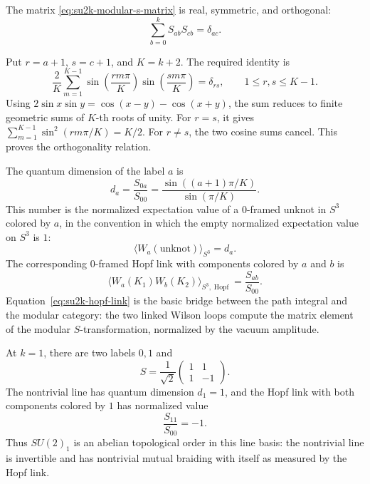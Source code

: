\begin{remark}
\label{rem:su2k-s-matrix-orthogonality}
The matrix \eqref{eq:su2k-modular-s-matrix} is real, symmetric, and
orthogonal:
\[
  \sum_{b=0}^k S_{ab}S_{cb}=\delta_{ac}.
\]

Put \(r=a+1\), \(s=c+1\), and \(K=k+2\).  The required identity is
\[
  \frac{2}{K}\sum_{m=1}^{K-1}
  \sin\!\left(\frac{rm\pi}{K}\right)
  \sin\!\left(\frac{sm\pi}{K}\right)
  =
  \delta_{rs},
  \qquad 1\le r,s\le K-1 .
\]
Using \(2\sin x\sin y=\cos(x-y)-\cos(x+y)\), the sum reduces to finite
geometric sums of \(K\)-th roots of unity.  For \(r=s\), it gives
\(\sum_{m=1}^{K-1}\sin^2(rm\pi/K)=K/2\).  For \(r\ne s\), the two cosine
sums cancel.  This proves the orthogonality relation.
\end{remark}

The quantum dimension of the label \(a\) is
\begin{equation}
  d_a=\frac{S_{0a}}{S_{00}}
  =
  \frac{\sin((a+1)\pi/K)}{\sin(\pi/K)} .
  \label{eq:su2k-quantum-dimension}
\end{equation}
This number is the normalized expectation value of a \(0\)-framed unknot in
\(S^3\) colored by \(a\), in the convention in which the empty normalized
expectation value on \(S^3\) is \(1\):
\begin{equation}
  \langle W_a(\text{unknot})\rangle_{S^3}
  =
  d_a .
  \label{eq:su2k-unknot-quantum-dimension}
\end{equation}
The corresponding \(0\)-framed Hopf link with components colored by \(a\) and
\(b\) is
\begin{equation}
  \langle W_a(K_1)W_b(K_2)\rangle_{S^3,\operatorname{Hopf}}
  =
  \frac{S_{ab}}{S_{00}} .
  \label{eq:su2k-hopf-link}
\end{equation}
Equation~\eqref{eq:su2k-hopf-link} is the basic bridge between the path
integral and the modular category: the two linked Wilson loops compute the
matrix element of the modular \(S\)-transformation, normalized by the vacuum
amplitude.

\begin{example}[\(SU(2)_1\)]
\label{ex:su2-level-one-cs}
At \(k=1\), there are two labels \(0,1\) and
\[
  S=\frac{1}{\sqrt2}
  \begin{pmatrix}
  1&1\\
  1&-1
  \end{pmatrix}.
\]
The nontrivial line has quantum dimension \(d_1=1\), and the Hopf link with
both components colored by \(1\) has normalized value
\[
  \frac{S_{11}}{S_{00}}=-1 .
\]
Thus \(SU(2)_1\) is an abelian topological order in this line basis: the
nontrivial line is invertible and has nontrivial mutual braiding with itself
as measured by the Hopf link.
\end{example}

